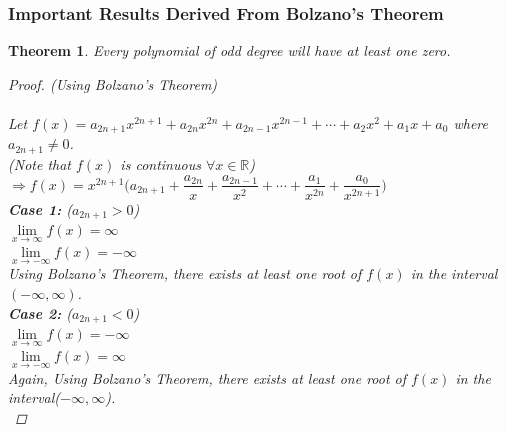 \documentclass[14]{article}
\newtheorem{theorem}{Theorem}
\theoremstyle{definition}
\theoremstyle{case}
\begin{document}
\subsubsection{Important Results Derived From Bolzano's Theorem}
\begin{theorem}
Every polynomial of odd degree will have at least one zero.
\begin{proof} (Using Bolzano's Theorem)\\\\
Let $f(x) = a_{2n+1}x^{2n+1} + a_{2n} x^{2n} + a_{2n-1} x^{2n-1} + \cdots + a_2 x^2 + a_1 x + a_0 $ where $a_{2n+1} \neq 0$.\\
(Note that $f(x)$ is continuous $\forall x \in \mathbb{R}$)\\
$\Rightarrow f(x) = x^{2n+1}\Big(a_{2n+1} + \dfrac{a_{2n}}{x} + \dfrac{a_{2n-1}}{x^2} + \cdots + \dfrac{a_1}{x^{2n}} + \dfrac{a_0}{x^{2n+1}} \Big)$\\
\textbf{Case 1:} ($a_{2n+1} > 0$)\\
$\lim\limits_{x \to \infty} f(x) = \infty$\\
$\lim\limits_{x \to -\infty} f(x) = -\infty$\\
Using Bolzano's Theorem, there exists at least one root of $f(x)$ in the interval $(-\infty, \infty)$.\\
\textbf{Case 2:} ($a_{2n + 1} < 0$)\\
$\lim\limits_{x \to \infty} f(x) = -\infty$\\
$\lim\limits_{x \to -\infty} f(x) = \infty$\\
Again, Using Bolzano's Theorem, there exists at least one root of $f(x)$ in the interval($-\infty, \infty$).\\
\end{proof}
\end{theorem}
\end{document}
